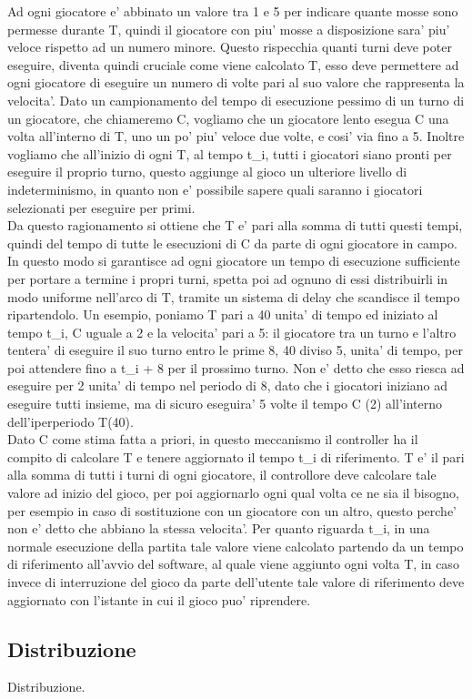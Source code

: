 Ad ogni giocatore e’ abbinato un valore tra 1 e 5 per indicare quante mosse sono permesse durante T, quindi il giocatore con piu’ mosse a disposizione sara’ piu’ veloce rispetto ad un numero minore. Questo rispecchia quanti turni deve poter eseguire, diventa quindi cruciale come viene calcolato T, esso deve permettere ad ogni giocatore di eseguire un numero di volte pari al suo valore che rappresenta la velocita’. Dato un campionamento del tempo di esecuzione pessimo di un turno di un giocatore, che chiameremo C, vogliamo che un giocatore lento esegua C una volta all’interno di T, uno un po’ piu’ veloce due volte, e cosi’ via fino a 5. Inoltre vogliamo che all’inizio di ogni T, al tempo t\_i, tutti i giocatori siano pronti per eseguire il proprio turno, questo aggiunge al gioco un ulteriore livello di indeterminismo, in quanto non e’ possibile sapere quali saranno i giocatori selezionati per eseguire per primi.\\

Da questo ragionamento si ottiene che T e’ pari alla somma di tutti questi tempi, quindi del tempo di tutte le esecuzioni di C da parte di ogni giocatore in campo. In questo modo si garantisce ad ogni giocatore un tempo di esecuzione sufficiente per portare a termine i propri turni, spetta poi ad ognuno di essi distribuirli in modo uniforme nell’arco di T, tramite un sistema di delay che scandisce il tempo ripartendolo. Un esempio, poniamo T pari a 40 unita’ di tempo ed iniziato al tempo t\_i, C uguale a 2 e la velocita’ pari a 5: il giocatore tra un turno e l’altro tentera’ di eseguire il suo turno entro le prime 8, 40 diviso 5, unita’ di tempo, per poi attendere fino a t\_i + 8 per il prossimo turno. Non e’ detto che esso riesca ad eseguire per 2 unita’ di tempo nel periodo di 8, dato che i giocatori iniziano ad eseguire tutti insieme, ma di sicuro eseguira’ 5 volte il tempo C (2) all’interno dell’iperperiodo T(40).\\

Dato C come stima fatta a priori, in questo meccanismo il controller ha il compito di calcolare T e tenere aggiornato il tempo t\_i di riferimento. T e’ il pari alla somma di tutti i turni di ogni giocatore, il controllore deve calcolare tale valore ad inizio del gioco, per poi aggiornarlo ogni qual volta ce ne sia il bisogno, per esempio in caso di sostituzione con un giocatore con un altro, questo perche’ non e’ detto che abbiano la stessa velocita’. Per quanto riguarda t\_i, in una normale esecuzione della partita tale valore viene calcolato partendo da un tempo di riferimento all’avvio del software, al quale viene aggiunto ogni volta T, in caso invece di interruzione del gioco da parte dell’utente tale valore di riferimento deve aggiornato con l’istante in cui il gioco puo’ riprendere.

\subsection*{Distribuzione}
%
\label{sec:analisi_distribuzione}

Distribuzione.


